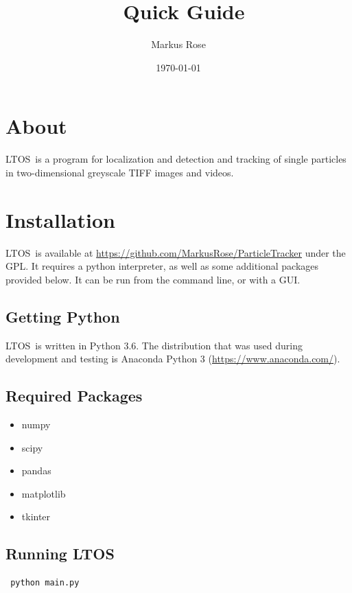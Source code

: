 \documentclass[oneside,letterpaper]{scrartcl}
\author{Markus Rose}
\title{\PN\ Quick Guide}
\date{\today}
\newcommand{\PN}{LTOS}
\begin{document}
\maketitle

\tableofcontents

\section{About}
\PN\ is a program for localization and detection and tracking of single particles in two-dimensional greyscale TIFF images and videos.

\section{Installation}

\PN\ is available at \url{https://github.com/MarkusRose/ParticleTracker} under the GPL. It requires a python interpreter, as well as some additional packages provided below. It can be run from the command line, or with a GUI.

\subsection{Getting Python}

\PN\ is written in Python 3.6. The distribution that was used during development and testing is 
Anaconda Python 3 (\url{https://www.anaconda.com/}).


\subsection{Required Packages}

\begin{itemize}
\item numpy
\item scipy
\item pandas
\item matplotlib
\item tkinter
\end{itemize}


\subsection{Running \PN}

\begin{verbatim} python main.py \end{verbatim}
\end{document}
